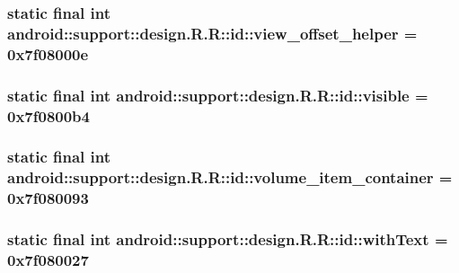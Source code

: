 \hypertarget{classandroid_1_1support_1_1design_1_1_r_1_1id_21d82640b28cfa62c6b1f900584ad4b9}{
\subsubsection[{view\_\-offset\_\-helper}]{\setlength{\rightskip}{0pt plus 5cm}static final int android::support::design.R.R::id::view\_\-offset\_\-helper = 0x7f08000e}}
\label{classandroid_1_1support_1_1design_1_1_r_1_1id_21d82640b28cfa62c6b1f900584ad4b9}


\hypertarget{classandroid_1_1support_1_1design_1_1_r_1_1id_0b2b163d36d806035e54a487b251c930}{
\subsubsection[{visible}]{\setlength{\rightskip}{0pt plus 5cm}static final int android::support::design.R.R::id::visible = 0x7f0800b4}}
\label{classandroid_1_1support_1_1design_1_1_r_1_1id_0b2b163d36d806035e54a487b251c930}


\hypertarget{classandroid_1_1support_1_1design_1_1_r_1_1id_96528a63ff421cbf46172008a677461f}{
\subsubsection[{volume\_\-item\_\-container}]{\setlength{\rightskip}{0pt plus 5cm}static final int android::support::design.R.R::id::volume\_\-item\_\-container = 0x7f080093}}
\label{classandroid_1_1support_1_1design_1_1_r_1_1id_96528a63ff421cbf46172008a677461f}


\hypertarget{classandroid_1_1support_1_1design_1_1_r_1_1id_4a261b0ce8e46974940e2d9b6db66d1d}{
\subsubsection[{withText}]{\setlength{\rightskip}{0pt plus 5cm}static final int android::support::design.R.R::id::withText = 0x7f080027}}
\label{classandroid_1_1support_1_1design_1_1_r_1_1id_4a261b0ce8e46974940e2d9b6db66d1d}


